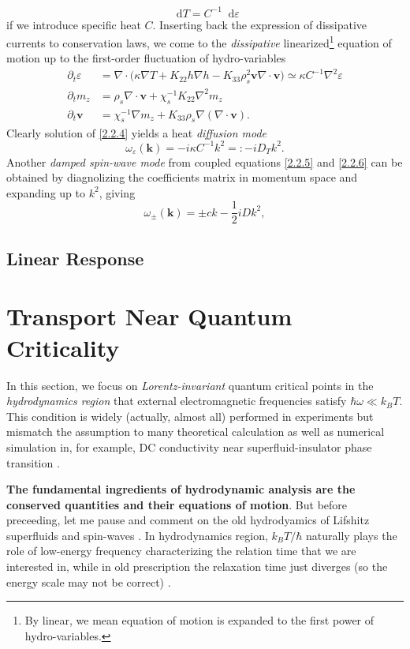 \documentclass[10pt,nofootinbib]{revtex4}
\newcommand*\dd{\mathop{}\!\mathrm{d}}
\begin{document}
			\begin{equation*}
				\dd T=C^{-1}\dd\varepsilon
			\end{equation*}
			if we introduce specific heat $C$. Inserting back the expression of dissipative currents to conservation laws, we come to the \emph{dissipative} linearized\footnote{By linear, we mean equation of motion is expanded to the first power of hydro-variables.} equation of motion up to the first-order fluctuation of hydro-variables
			\begin{align}
				\partial_t \varepsilon&=\nabla\cdot\bigg(\kappa\nabla T+K_{22}h\nabla h-K_{33}\rho_s^2\bm{v}\nabla\cdot\bm{v}\bigg)\simeq\kappa C^{-1}\nabla^2\varepsilon\label{2.2.4}\\
				\partial_t m_z&=\rho_s\nabla\cdot\bm{v}+\chi_s^{-1}K_{22}\nabla^2m_z\label{2.2.5}\\
				\partial_t\bm{v}&=\chi_s^{-1}\nabla m_z+K_{33}\rho_s\nabla(\nabla\cdot\bm{v})\label{2.2.6}.
			\end{align}
			Clearly solution of \eqref{2.2.4} yields a heat \emph{diffusion mode}
			\begin{equation}\label{2.2.7}
				\omega_\varepsilon(\bm{k})=-i\kappa C^{-1}k^2=:-iD_Tk^2.
			\end{equation}
			Another \emph{damped spin-wave mode} from coupled equations \eqref{2.2.5} and \eqref{2.2.6} can be obtained by diagnolizing the coefficients matrix in momentum space and expanding up to $k^2$, giving
			\begin{equation}\label{2.2.8}
				\omega_{\pm}(\bm{k})=\pm ck-\dfrac{1}{2}iDk^2,
			\end{equation}
	\subsection{Linear Response}

\section{Transport Near Quantum Criticality}
	In this section, we focus on \emph{Lorentz-invariant} quantum critical points in the \emph{hydrodynamics region} that external electromagnetic frequencies satisfy $\hbar\omega\ll k_B T$. This condition is widely (actually, almost all) performed in experiments but mismatch the assumption to many theoretical calculation as well as numerical simulation in, for example, DC conductivity near superfluid-insulator phase transition \cite{damle1997nonzero}.\par
	\textbf{The fundamental ingredients of hydrodynamic analysis are the conserved quantities and their equations of motion}. But before preceeding, let me pause and comment on the old hydrodyamics of Lifshitz superfluids and spin-waves \cite{hohenberg1977theory,halperin1969hydrodynamic}. {\color{red} In hydrodynamics region, $k_BT/\hbar$ naturally plays the role of low-energy frequency characterizing the relation time that we are interested in, while in old prescription the relaxation time just diverges (so the energy scale may not be correct) \cite{hartnoll2007theory}}.
\end{document}
